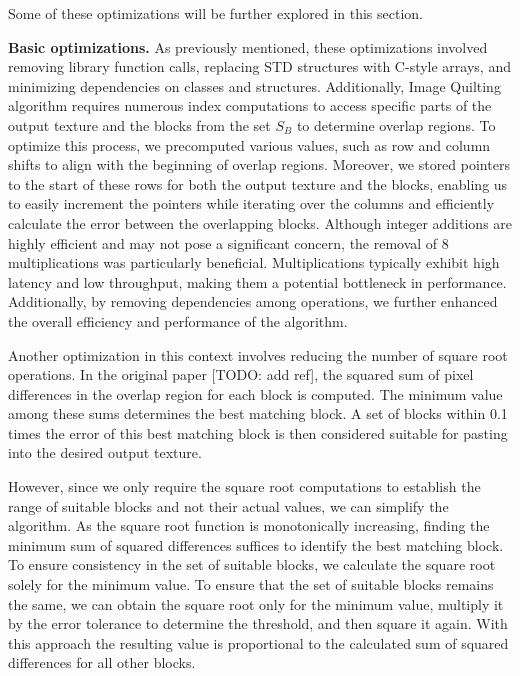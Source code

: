 \documentclass[letterpaper]{article}
\newcommand{\mypar}[1]{{\bf #1.}}
\begin{document}
Some of these optimizations will be further explored in this section.

\mypar{Basic optimizations}
As previously mentioned, these optimizations involved removing library function calls, replacing STD structures with C-style arrays, and minimizing dependencies on classes and structures. Additionally, Image Quilting algorithm requires numerous index computations to access specific parts of the output texture and the blocks from the set \textit{$S_{B}$} to determine overlap regions. To optimize this process, we precomputed various values, such as row and column shifts to align with the beginning of overlap regions. Moreover, we stored pointers to the start of these rows for both the output texture and the blocks, enabling us to easily increment the pointers while iterating over the columns and efficiently calculate the error between the overlapping blocks. Although integer additions are highly efficient and may not pose a significant concern, the removal of 8 multiplications was particularly beneficial. Multiplications typically exhibit high latency and low throughput, making them a potential bottleneck in performance. Additionally, by removing dependencies among operations, we further enhanced the overall efficiency and performance of the algorithm.

Another optimization in this context involves reducing the number of square root operations. In the original paper [TODO: add ref], the squared sum of pixel differences in the overlap region for each block is computed. The minimum value among these sums determines the best matching block. A set of blocks within 0.1 times the error of this best matching block is then considered suitable for pasting into the desired output texture.

However, since we only require the square root computations to establish the range of suitable blocks and not their actual values, we can simplify the algorithm. As the square root function is monotonically increasing, finding the minimum sum of squared differences suffices to identify the best matching block. To ensure consistency in the set of suitable blocks, we calculate the square root solely for the minimum value. To ensure that the set of suitable blocks remains the same, we can obtain the square root only for the minimum value, multiply it by the error tolerance to determine the threshold, and then square it again. With this approach the resulting value is proportional to the calculated sum of squared differences for all other blocks. 
\end{document}
